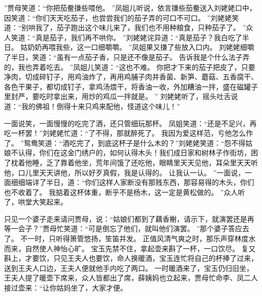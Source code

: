 ”贾母笑道：“你把茄鲞搛些喂他。
”凤姐儿听说，依言搛些茄鲞送入刘姥姥口中，因笑道：“你们天天吃茄子，也尝尝我们的茄子弄的可口不可口。
”刘姥姥笑道：“别哄我了，茄子跑出这个味儿来了，我们也不用种粮食，只种茄子了。
”众人笑道：“真是茄子，我们再不哄你。
”刘姥姥诧异道：“真是茄子？我白吃了半日。
姑奶奶再喂我些，这一口细嚼嚼。
”凤姐果又搛了些放入口内。
刘姥姥细嚼了半日，笑道：“虽有一点茄子香，只是还不像是茄子。
告诉我是个什么法子弄的，我也弄着吃去。
”凤姐儿笑道：“这也不难。
你把才下来的茄子把皮\qian 了，只要净肉，切成碎钉子，用鸡油炸了，再用鸡脯子肉并香菌、新笋、蘑菇、五香腐干、各色干果子，都切成钉子，拿鸡汤煨干，将香油一收，外加糟油一拌，盛在磁罐子里封严，要吃时拿出来，用炒的鸡瓜一拌就是。
”
刘姥姥听了，摇头吐舌说道：“我的佛祖！倒得十来只鸡来配他，怪道这个味儿！”\par
一面说笑，一面慢慢的吃完了酒，还只管细玩那杯。
凤姐笑道：“还是不足兴，再吃一杯罢！”刘姥姥忙道：“了不得，那就醉死了。
我因为爱这样范，亏他怎么作了。
”鸳鸯笑道：“酒吃完了，到底这杯子是什么木的？”刘姥姥笑道：“怨不得姑娘不认得，你们在这金门绣户的，如何认得木头！我们成日家和树林子作街坊，困了枕着他睡，乏了靠着他坐，荒年间饿了还吃他，眼睛里天天见他，耳朵里天天听他，口儿里天天讲他，所以好歹真假，我是认得的。
让我认一认。
”一面说，一面细细端详了半日，道：“你们这样人家断没有那贱东西，那容易得的木头，你们也不收着了。
我掂着这杯体重，断乎不是杨木，这一定是黄松做的。
”众人听了，哄堂大笑起来。
\par
只见一个婆子走来请问贾母，说：“姑娘们都到了藕香榭，请示下，就演罢还是再等一会子？”贾母忙笑道：“可是倒忘了他们，就叫他们演罢。
”那个婆子答应去了。
不一时，只听得箫管悠扬，笙笛并发。
正值风清气爽之时，那乐声穿林度水而来，自然使人神怡心旷。
宝玉先禁不住，拿起壶来斟了一杯，一口饮尽。
复又斟上，才要饮，只见王夫人也要饮，命人换暖酒，宝玉连忙将自己的杯捧了过来，送到王夫人口边，王夫人便就他手内吃了两口。
一时暖酒来了，宝玉仍归旧坐，王夫人提了暖壶下席来，众人皆都出了席，薛姨妈也立起来，贾母忙命李、凤二人接过壶来：“让你姑妈坐了，大家才便。
